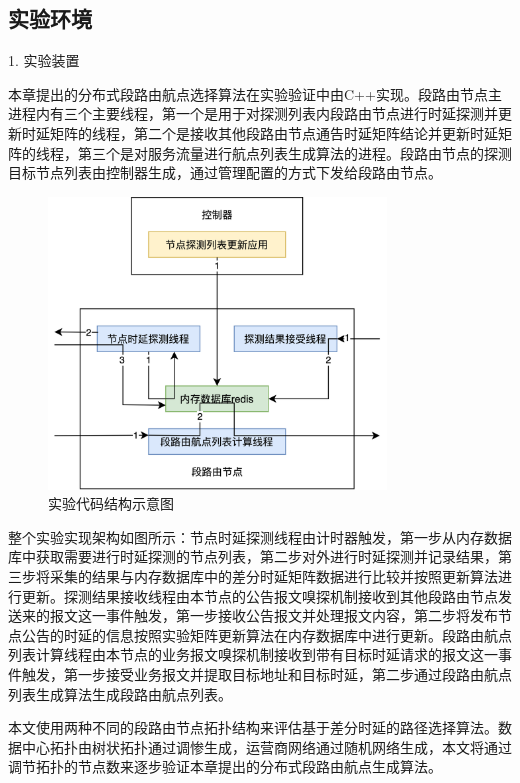 \subsection{实验环境}

1. 实验装置

本章提出的分布式段路由航点选择算法在实验验证中由C++实现。段路由节点主进程内有三个主要线程，第一个是用于对探测列表内段路由节点进行时延探测并更新时延矩阵的线程，第二个是接收其他段路由节点通告时延矩阵结论并更新时延矩阵的线程，第三个是对服务流量进行航点列表生成算法的进程。段路由节点的探测目标节点列表由控制器生成，通过管理配置的方式下发给段路由节点。

\begin{figure}[htbp]
\setlength{\abovecaptionskip}{15pt plus 3pt minus 2pt}
\centerline{\includegraphics[width=0.8\textwidth]{./figures/ch4-test-code.png}}
\caption{实验代码结构示意图}
\label{fig-ch4-test-code}
\end{figure}
    
整个实验实现架构如图所示：节点时延探测线程由计时器触发，第一步从内存数据库中获取需要进行时延探测的节点列表，第二步对外进行时延探测并记录结果，第三步将采集的结果与内存数据库中的差分时延矩阵数据进行比较并按照更新算法进行更新。探测结果接收线程由本节点的公告报文嗅探机制接收到其他段路由节点发送来的报文这一事件触发，第一步接收公告报文并处理报文内容，第二步将发布节点公告的时延的信息按照实验矩阵更新算法在内存数据库中进行更新。段路由航点列表计算线程由本节点的业务报文嗅探机制接收到带有目标时延请求的报文这一事件触发，第一步接受业务报文并提取目标地址和目标时延，第二步通过段路由航点列表生成算法生成段路由航点列表。

本文使用两种不同的段路由节点拓扑结构来评估基于差分时延的路径选择算法。数据中心拓扑由树状拓扑通过调惨生成，运营商网络通过随机网络生成，本文将通过调节拓扑的节点数来逐步验证本章提出的分布式段路由航点生成算法。

